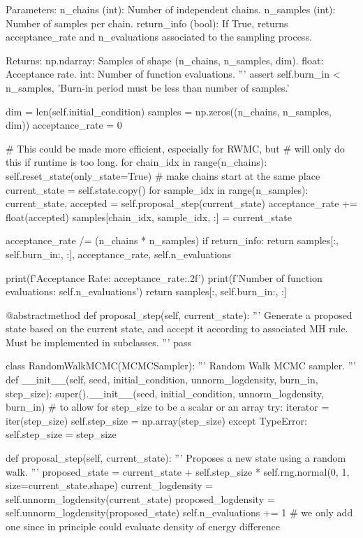 \documentclass[a4paper, 12pt,oneside]{article}
\begin{document}
\begin{python}
					Parameters:
					n_chains (int): Number of independent chains.
					n_samples (int): Number of samples per chain.
					return_info (bool): If True, returns acceptance_rate and n_evaluations associated to the sampling process.

					Returns:
					np.ndarray: Samples of shape (n_chains, n_samples, dim).
					float: Acceptance rate.
					int: Number of function evaluations.
					'''
					assert self.burn_in < n_samples, 'Burn-in period must be less than number of samples.'

					dim = len(self.initial_condition)
					samples = np.zeros((n_chains, n_samples, dim))
					acceptance_rate = 0
					
					# This could be made more efficient, especially for RWMC, but 
					# will only do this if runtime is too long.
					for chain_idx in range(n_chains):
						self.reset_state(only_state=True) # make chains start at the same place
						current_state = self.state.copy()
						for sample_idx in range(n_samples):
							current_state, accepted = self.proposal_step(current_state)
							acceptance_rate += float(accepted)
							samples[chain_idx, sample_idx, :] = current_state
					
					acceptance_rate /= (n_chains * n_samples)
					if return_info:
						return samples[:, self.burn_in:, :], acceptance_rate, self.n_evaluations

					print(f'Acceptance Rate: {acceptance_rate:.2f}')
					print(f'Number of function evaluations: {self.n_evaluations}')
					return samples[:, self.burn_in:, :]
				
				@abstractmethod
				def proposal_step(self, current_state):
					'''
					Generate a proposed state based on the current state, and accept it according to associated MH rule.
					Must be implemented in subclasses.
					'''
					pass

			class RandomWalkMCMC(MCMCSampler):
				'''
				Random Walk MCMC sampler.
				'''
				def __init__(self, seed, initial_condition, unnorm_logdensity, burn_in, step_size):
					super().__init__(seed, initial_condition, unnorm_logdensity, burn_in)
					# to allow for step_size to be a scalar or an array
					try:
						iterator = iter(step_size)
						self.step_size = np.array(step_size)
					except TypeError:
						self.step_size = step_size
				
				def proposal_step(self, current_state):
					'''
					Proposes a new state using a random walk.
					'''
					proposed_state = current_state + self.step_size * self.rng.normal(0, 1, size=current_state.shape)
					current_logdensity = self.unnorm_logdensity(current_state)
					proposed_logdensity = self.unnorm_logdensity(proposed_state)
					self.n_evaluations += 1 
					# we only add one since in principle could evaluate density of energy difference


\end{python}
\end{document}
